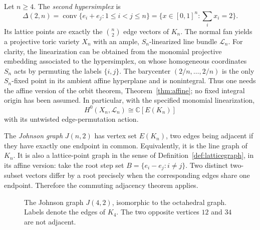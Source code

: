 \documentclass[12pt,letterpaper]{article}
\theoremstyle{definition}
\theoremstyle{remark}
\numberwithin{equation}{section}
\newcommand{\CC}{\mathbb C}
\newcommand{\LL}{\mathcal L}
\begin{document}
Let $n\geq4$. The \emph{second hypersimplex} is
\begin{equation}\label{eq:hypersimplex}
\Delta(2,n)=\operatorname{conv}\{e_i+e_j:1\leq i<j\leq n\}
=\{x\in[0,1]^n:\sum_i x_i=2\}.
\end{equation}
Its lattice points are exactly the $\binom n2$ edge vectors of $K_n$. The normal fan yields a projective toric variety $X_n$ with an ample, $S_n$-linearized line bundle $\LL_n$. For clarity, the linearization can be obtained from the monomial projective embedding associated to the hypersimplex, on whose homogeneous coordinates $S_n$ acts by permuting the labels $\{i,j\}$. The barycenter $(2/n,\ldots,2/n)$ is the only $S_n$-fixed point in its ambient affine hyperplane and is nonintegral. Thus one needs the affine version of the orbit theorem, Theorem~\ref{thm:affine}; no fixed integral origin has been assumed. In particular, with the specified monomial linearization,
\begin{equation}\label{eq:edgeaction}
H^0(X_n,\LL_n)\cong\CC[E(K_n)]
\end{equation}
with its untwisted edge-permutation action.

The \emph{Johnson graph} $J(n,2)$ has vertex set $E(K_n)$, two edges being adjacent if they have exactly one endpoint in common. Equivalently, it is the line graph of $K_n$. It is also a lattice-point graph in the sense of Definition~\ref{def:latticegraph}, in its affine version: take the root step set $B=\{e_i-e_j:i\ne j\}$. Two distinct two-subset vectors differ by a root precisely when the corresponding edges share one endpoint. Therefore the commuting adjacency theorem applies.

\begin{figure}[ht]
\centering
{}
\caption{The Johnson graph $J(4,2)$, isomorphic to the octahedral graph. Labels denote the edges of $K_4$. The two opposite vertices $12$ and $34$ are not adjacent.}\label{fig:johnson}
\end{figure}
\end{document}
